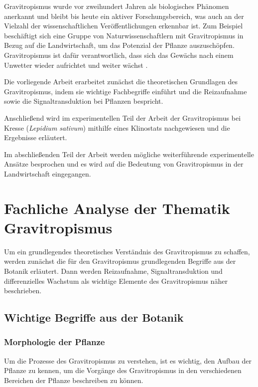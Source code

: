 \documentclass[
11pt, 
ngerman,
listof=totocnumbered,
oneside,
bibliography=totocnumbered,
abstracton
]{scrreprt}
\begin{document}
Gravitropismus wurde vor zweihundert Jahren als biologisches Phänomen anerkannt und bleibt bis heute ein aktiver Forschungsbereich, was auch an der Vielzahl der wissenschaftlichen Veröffentlichungen erkennbar ist. Zum Beispiel beschäftigt sich eine Gruppe von Naturwissenschaftlern mit Gravitropismus in Bezug auf die Landwirtschaft, um das Potenzial der Pflanze auszuschöpfen. Gravitropismus ist dafür verantwortlich, dass sich das Gewächs nach einem Unwetter wieder aufrichtet und weiter wächst \parencite[343]{Chen1999}.

Die vorliegende Arbeit erarbeitet zunächst die theoretischen Grundlagen des Gravitropismus, indem sie wichtige Fachbegriffe einführt und die Reizaufnahme sowie die Signaltransduktion bei Pflanzen bespricht. 

Anschließend wird im experimentellen Teil der Arbeit der Gravitropismus bei Kresse (\emph{Lepidium sativum}) mithilfe eines Klinostats nachgewiesen und die Ergebnisse erläutert. 

Im abschließenden Teil der Arbeit werden mögliche weiterführende experimentelle Ansätze besprochen und es wird auf die Bedeutung von Gravitropismus in der Landwirtschaft eingegangen.


\chapter{Fachliche Analyse der Thematik Gravitropismus}

Um ein grundlegendes theoretisches Verständnis des Gravitropismus zu schaffen, werden zunächst die für den Gravitropismus grundlegenden Begriffe aus der Botanik erläutert. Dann werden Reizaufnahme, Signaltransduktion und differenzielles Wachstum als wichtige Elemente des Gravitropismus näher beschrieben. 

\section{Wichtige Begriffe aus der Botanik}

\subsection{Morphologie der Pflanze}

Um die Prozesse des Gravitropismus zu verstehen, ist es wichtig, den Aufbau der Pflanze zu kennen, um die Vorgänge des Gravitropismus in den verschiedenen Bereichen der Pflanze beschreiben zu können.
\end{document}
